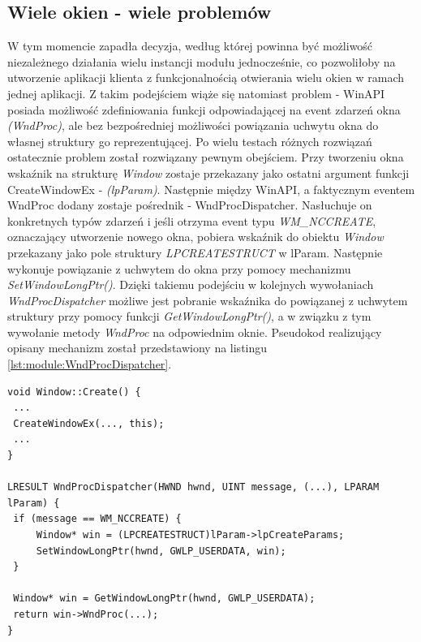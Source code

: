 \subsection{Wiele okien - wiele problemów}
W tym momencie zapadła decyzja, według której powinna być możliwość niezależnego działania wielu instancji modułu jednocześnie, co pozwoliłoby na utworzenie aplikacji klienta z funkcjonalnością otwierania wielu okien w ramach jednej aplikacji. Z takim podejściem wiąże się natomiast problem - WinAPI posiada możliwość zdefiniowania funkcji odpowiadającej na event zdarzeń okna \textit{(WndProc)}, ale bez bezpośredniej możliwości powiązania uchwytu okna do własnej struktury go reprezentującej. Po wielu testach różnych rozwiązań ostatecznie problem został rozwiązany pewnym obejściem. Przy tworzeniu okna wskaźnik na strukturę \textit{Window} zostaje przekazany jako ostatni argument funkcji CreateWindowEx - \textit{(lpParam)}. Następnie między WinAPI, a faktycznym eventem WndProc dodany zostaje pośrednik - WndProcDispatcher. Nasłuchuje on konkretnych typów zdarzeń i jeśli otrzyma event typu \textit{WM\_NCCREATE}, oznaczający utworzenie nowego okna, pobiera wskaźnik do obiektu \textit{Window} przekazany jako pole struktury \textit{LPCREATESTRUCT} w lParam. Następnie wykonuje powiązanie z uchwytem do okna przy pomocy mechanizmu \textit{SetWindowLongPtr()}. Dzięki takiemu podejściu w kolejnych wywołaniach \textit{WndProcDispatcher} możliwe jest pobranie wskaźnika do powiązanej z uchwytem struktury przy pomocy funkcji \textit{GetWindowLongPtr()}, a w związku z tym wywołanie metody \textit{WndProc} na odpowiednim oknie. Pseudokod realizujący opisany mechanizm został przedstawiony na listingu \ref{lst:module:WndProcDispatcher}.

\begin{lstlisting}[caption={Pseudokod integracji wskaźnika okna z uchwytem HWND}, label={lst:module:WndProcDispatcher}]
void Window::Create() {
 ...
 CreateWindowEx(..., this);
 ...
}

LRESULT WndProcDispatcher(HWND hwnd, UINT message, (...), LPARAM lParam) {
 if (message == WM_NCCREATE) {
     Window* win = (LPCREATESTRUCT)lParam->lpCreateParams;
     SetWindowLongPtr(hwnd, GWLP_USERDATA, win);
 }
	
 Window* win = GetWindowLongPtr(hwnd, GWLP_USERDATA);
 return win->WndProc(...);
}
\end{lstlisting}

